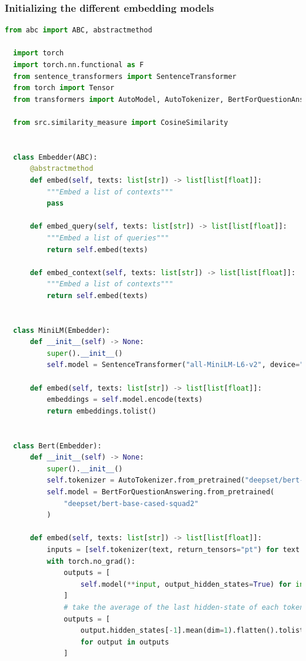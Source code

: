 \documentclass[a4paper,12pt]{article}
\begin{document}
\subsubsection*{Initializing the different embedding models}
\begin{lstlisting}[language=Python]
  from abc import ABC, abstractmethod

  import torch
  import torch.nn.functional as F
  from sentence_transformers import SentenceTransformer
  from torch import Tensor
  from transformers import AutoModel, AutoTokenizer, BertForQuestionAnswering
  
  from src.similarity_measure import CosineSimilarity
  
  
  class Embedder(ABC):
      @abstractmethod
      def embed(self, texts: list[str]) -> list[list[float]]:
          """Embed a list of contexts"""
          pass
  
      def embed_query(self, texts: list[str]) -> list[list[float]]:
          """Embed a list of queries"""
          return self.embed(texts)
  
      def embed_context(self, texts: list[str]) -> list[list[float]]:
          """Embed a list of contexts"""
          return self.embed(texts)
  
  
  class MiniLM(Embedder):
      def __init__(self) -> None:
          super().__init__()
          self.model = SentenceTransformer("all-MiniLM-L6-v2", device="cpu")
  
      def embed(self, texts: list[str]) -> list[list[float]]:
          embeddings = self.model.encode(texts)
          return embeddings.tolist()
  
  
  class Bert(Embedder):
      def __init__(self) -> None:
          super().__init__()
          self.tokenizer = AutoTokenizer.from_pretrained("deepset/bert-base-cased-squad2")
          self.model = BertForQuestionAnswering.from_pretrained(
              "deepset/bert-base-cased-squad2"
          )
  
      def embed(self, texts: list[str]) -> list[list[float]]:
          inputs = [self.tokenizer(text, return_tensors="pt") for text in texts]
          with torch.no_grad():
              outputs = [
                  self.model(**input, output_hidden_states=True) for input in inputs
              ]
              # take the average of the last hidden-state of each token to represent the sentence
              outputs = [
                  output.hidden_states[-1].mean(dim=1).flatten().tolist()
                  for output in outputs
              ]
  

\end{lstlisting}
\end{document}
